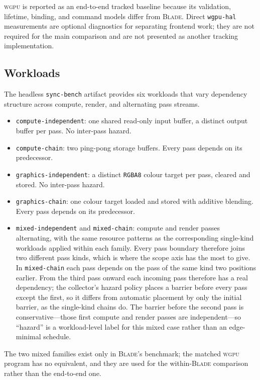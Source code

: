 \documentclass[10pt,twocolumn]{article}
\newcommand{\blade}{\textsc{Blade}}
\newcommand{\wgpu}{\textsc{wgpu}}
\begin{document}
\wgpu{} is reported as an end-to-end tracked baseline because its validation,
lifetime, binding, and command models differ from \blade. Direct
\texttt{wgpu-hal} measurements are optional diagnostics for separating frontend
work; they are not required for the main comparison and are not presented as
another tracking implementation.

\subsection{Workloads}
\label{sec:workloads}

The headless \texttt{sync-bench} artifact provides six workloads that vary
dependency structure across compute, render, and alternating pass streams.

\begin{itemize}
  \item \texttt{compute-independent}: one shared read-only input buffer, a
  distinct output buffer per pass. No inter-pass hazard.
  \item \texttt{compute-chain}: two ping-pong storage buffers. Every pass
  depends on its predecessor.
  \item \texttt{graphics-independent}: a distinct \texttt{RGBA8} colour target
  per pass, cleared and stored. No inter-pass hazard.
  \item \texttt{graphics-chain}: one colour target loaded and stored with
  additive blending. Every pass depends on its predecessor.
  \item \texttt{mixed-independent} and \texttt{mixed-chain}: compute and render
  passes alternating, with the same resource patterns as the corresponding
  single-kind workloads applied within each family. Every pass boundary
  therefore joins two different pass kinds, which is where the scope axis has
  the most to give. In \texttt{mixed-chain} each pass depends on the pass of
  the same kind two positions earlier. From the third pass onward each incoming
  pass therefore has a real dependency; the collector's hazard policy places a
  barrier before every pass except the first, so it differs from automatic
  placement by only the initial barrier, as the single-kind chains do. The
  barrier before the second pass is conservative---those first compute and
  render passes are independent---so ``hazard'' is a workload-level label for
  this mixed case rather than an edge-minimal schedule.
\end{itemize}

The two mixed families exist only in \blade's benchmark; the matched \wgpu{}
program has no equivalent, and they are used for the within-\blade{}
comparison rather than the end-to-end one.
\end{document}

